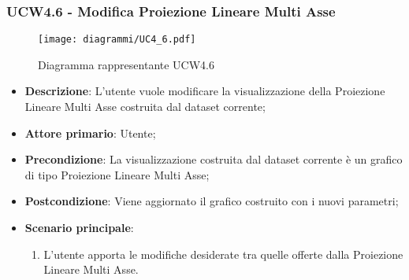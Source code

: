\newpage
\subsubsection{UCW4.6 - Modifica Proiezione Lineare Multi Asse}
\label{ssub:ucw4.6}
\begin{figure}[h]
    \centering
    \texttt{[image: diagrammi/UC4\_6.pdf]}
    \caption{Diagramma rappresentante UCW4.6}
    \label{fig:UCW4.6}
\end{figure}

\begin{itemize}
    \item \textbf{Descrizione}: L’utente vuole modificare la visualizzazione della Proiezione Lineare Multi Asse
                                costruita dal dataset corrente;

    \item \textbf{Attore primario}: Utente;

    \item \textbf{Precondizione}:   La visualizzazione costruita dal dataset corrente è un grafico di tipo Proiezione Lineare Multi Asse;
    \item \textbf{Postcondizione}:  Viene aggiornato il grafico costruito con i nuovi parametri;

	\item \textbf{Scenario principale}:
		\begin{enumerate}
            \item L'utente apporta le modifiche desiderate tra quelle offerte dalla Proiezione Lineare Multi Asse.
        \end{enumerate}
\end{itemize}

